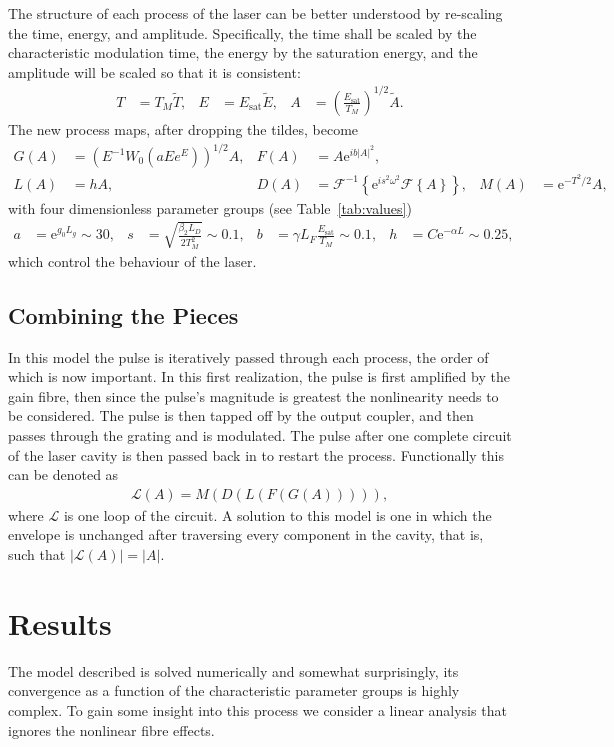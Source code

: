 \documentclass[12pt]{article}
\newcommand{\Es}{E_{\textrm{sat}}}
\newcommand{\FT}[1]{\mathcal{F}\left\{ #1 \right\}}
\newcommand{\FTi}[1]{\mathcal{F}^{-1}\left\{ #1 \right\}}
\begin{document}
The structure of each process of the laser can be better understood by re-scaling the time, energy, and amplitude. Specifically, the time shall be scaled by the characteristic modulation time, the energy by the saturation energy, and the amplitude will be scaled so that it is consistent:
\begin{align*}
	T &= T_M \widetilde{T},& E &= \Es \widetilde{E},& A &= \left( \frac{\Es}{T_M} \right)^{1/2} \widetilde{A}.
\end{align*}
The new process maps, after dropping the tildes, become
\begin{align*}
	G(A) &= \left(E^{-1} W_0 \left( a E e^{E}\right) \right)^{1/2} A,&
	F(A) &= A \textrm{e}^{i b |A|^2}, \\
	L(A) &= h A,&
	D(A) &= \FTi{\textrm{e}^{i s^2 \omega^2} \FT{A}},&
	M(A) &= \textrm{e}^{-T^2 / 2} A,
\end{align*}
with four dimensionless parameter groups (see Table~\ref{tab:values})
\begin{align*}
	a &= \textrm{e}^{g_0 L_g} \sim 30,& s &= \sqrt{\frac{\beta_2 L_D}{2 T_M^2}} \sim 0.1,&
	b &= \gamma L_F \frac{\Es}{T_M} \sim 0.1,& h &= C \textrm{e}^{-\alpha L} \sim 0.25,
\end{align*}
which control the behaviour of the laser.

\subsection{Combining the Pieces}
In this model the pulse is iteratively passed through each process, the order of which is now important. In this first realization, the pulse is first amplified by the gain fibre, then since the pulse's magnitude is greatest the nonlinearity needs to be considered. The pulse is then tapped off by the output coupler, and then passes through the grating and is modulated. The pulse after one complete circuit of the laser cavity is then passed back in to restart the process. Functionally this can be denoted as
\begin{align*}
	\mathcal{L}(A) = M(D(L(F(G(A))))),
\end{align*}
where $\mathcal{L}$ is one loop of the circuit. A solution to this model is one in which the envelope is unchanged after traversing every component in the cavity, that is, such that $|\mathcal{L}(A)| = |A|$.

\section{Results}
The model described is solved numerically and somewhat surprisingly, its convergence as a function of the characteristic parameter groups is highly complex. To gain some insight into this process we consider a linear analysis that ignores the nonlinear fibre effects.
\end{document}
